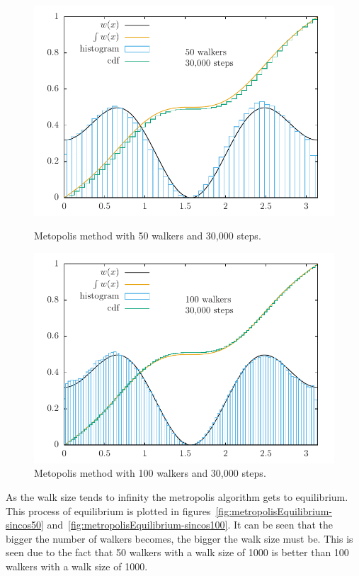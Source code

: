 \documentclass[11pt]{article}
\begin{document}
\begin{figure}[H]
  \centering

  \includegraphics[width=.6\linewidth]{metropolis-sincos50}
  \caption{Metopolis method with 50 walkers and 30,000 steps.}
\label{fig:metropolis-sincos50}
  \centering
  \includegraphics[width=.6\linewidth]{metropolis-sincos100}
  \caption{Metopolis method with 100 walkers and 30,000 steps.}
\label{fig:metropolis-sincos100}
\end{figure}

As the walk size tends to infinity the metropolis algorithm gets to equilibrium. This process of equilibrium is plotted in figures~\ref{fig:metropolisEquilibrium-sincos50} and~\ref{fig:metropolisEquilibrium-sincos100}. It can be seen that the bigger the number of walkers becomes, the bigger the walk size must be. This is seen due to the fact that 50 walkers with a walk size of 1000 is better than 100 walkers with a walk size of 1000.
\end{document}
